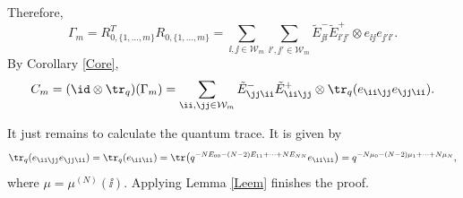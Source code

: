 Therefore,
\[
\Gamma_m = R^T_{0,\{1,\dots,m\} } R_{0,\{1,\dots,m\} } = \sum_{\ii,\jj \in \mathcal{W}_m } \sum_{\ii',\jj' \in \mathcal{W}_m } \tilde{E}_{\jj \ii}^-\tilde{E}_{\ii'\jj'}^+ \otimes e_{\ii\jj}e_{\jj'\ii'}.
\]
By Corollary \ref{Core},
\[
C_m = (\id \otimes \tr_q)(\Gamma_m) = \sum_{\ii,\jj \in \mathcal{W}_m } \tilde{E}_{\jj \ii}^-\tilde{E}_{\ii\jj}^+ \otimes \tr_q(e_{\ii\jj}e_{\jj\ii}).
\]

It just remains to calculate the quantum trace. It is given by
\[
\tr_q(e_{\ii\jj}e_{\jj\ii}) = \tr_q(e_{\ii\ii}) = \tr\big(q^{-NE_{00} -(N-2)E_{11} + \dots + NE_{NN}} e_{\ii\ii}\big) = q^{-N\mu_{0} -(N-2)\mu_{1} + \dots + N\mu_{N}},
\]
where $\mu=\mu^{(N)}(\ii)$. Applying Lemma \ref{Leem} finishes the proof.

